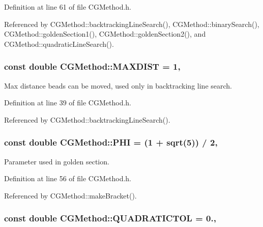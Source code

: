 Definition at line 61 of file C\+G\+Method.\+h.



Referenced by C\+G\+Method\+::backtracking\+Line\+Search(), C\+G\+Method\+::binary\+Search(), C\+G\+Method\+::golden\+Section1(), C\+G\+Method\+::golden\+Section2(), and C\+G\+Method\+::quadratic\+Line\+Search().

\hypertarget{classCGMethod_a814ea57c3493f31f4ffd1cfa71795871}{
\subsubsection[{M\+A\+X\+D\+I\+S\+T}]{\setlength{\rightskip}{0pt plus 5cm}const double C\+G\+Method\+::\+M\+A\+X\+D\+I\+S\+T = 1\hspace{0.3cm}{\ttfamily [protected]}, {\ttfamily [inherited]}}}\label{classCGMethod_a814ea57c3493f31f4ffd1cfa71795871}


Max distance beads can be moved, used only in backtracking line search. 



Definition at line 39 of file C\+G\+Method.\+h.



Referenced by C\+G\+Method\+::backtracking\+Line\+Search().

\hypertarget{classCGMethod_ab6ca0706dec56fe6e35f15f9791b3e23}{
\subsubsection[{P\+H\+I}]{\setlength{\rightskip}{0pt plus 5cm}const double C\+G\+Method\+::\+P\+H\+I = (1 + sqrt(5)) / 2\hspace{0.3cm}{\ttfamily [protected]}, {\ttfamily [inherited]}}}\label{classCGMethod_ab6ca0706dec56fe6e35f15f9791b3e23}


Parameter used in golden section. 



Definition at line 56 of file C\+G\+Method.\+h.



Referenced by C\+G\+Method\+::make\+Bracket().

\hypertarget{classCGMethod_acd9c51fe93f6d563f731dd2e30eb7922}{
\subsubsection[{Q\+U\+A\+D\+R\+A\+T\+I\+C\+T\+O\+L}]{\setlength{\rightskip}{0pt plus 5cm}const double C\+G\+Method\+::\+Q\+U\+A\+D\+R\+A\+T\+I\+C\+T\+O\+L = 0.\hspace{0.3cm}{\ttfamily [protected]}, {\ttfamily [inherited]}}}\label{classCGMethod_acd9c51fe93f6d563f731dd2e30eb7922}


